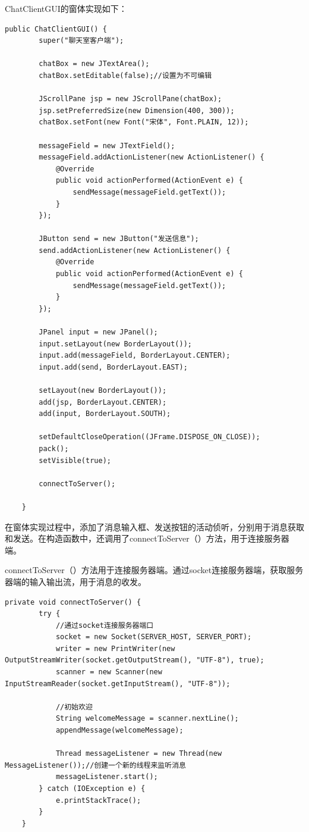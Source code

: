 \documentclass[UTF8,12pt]{article}
\begin{document}
ChatClientGUI的窗体实现如下：
\begin{lstlisting}[title=ChatClientGUI窗体实现,frame=shadowbox]
    public ChatClientGUI() {
        super("聊天室客户端");

        chatBox = new JTextArea();
        chatBox.setEditable(false);//设置为不可编辑

        JScrollPane jsp = new JScrollPane(chatBox);
        jsp.setPreferredSize(new Dimension(400, 300));
        chatBox.setFont(new Font("宋体", Font.PLAIN, 12));

        messageField = new JTextField();
        messageField.addActionListener(new ActionListener() {
            @Override
            public void actionPerformed(ActionEvent e) {
                sendMessage(messageField.getText());
            }
        });

        JButton send = new JButton("发送信息");
        send.addActionListener(new ActionListener() {
            @Override
            public void actionPerformed(ActionEvent e) {
                sendMessage(messageField.getText());
            }
        });

        JPanel input = new JPanel();
        input.setLayout(new BorderLayout());
        input.add(messageField, BorderLayout.CENTER);
        input.add(send, BorderLayout.EAST);

        setLayout(new BorderLayout());
        add(jsp, BorderLayout.CENTER);
        add(input, BorderLayout.SOUTH);

        setDefaultCloseOperation((JFrame.DISPOSE_ON_CLOSE));
        pack();
        setVisible(true);

        connectToServer();

    }
\end{lstlisting}
在窗体实现过程中，添加了消息输入框、发送按钮的活动侦听，分别用于消息获取和发送。在构造函数中，还调用了connectToServer（）方法，用于连接服务器端。

connectToServer（）方法用于连接服务器端。通过socket连接服务器端，获取服务器端的输入输出流，用于消息的收发。
\begin{lstlisting}[title=connectToServer方法实现,frame=shadowbox]
    private void connectToServer() {
        try {
            //通过socket连接服务器端口
            socket = new Socket(SERVER_HOST, SERVER_PORT);
            writer = new PrintWriter(new OutputStreamWriter(socket.getOutputStream(), "UTF-8"), true);
            scanner = new Scanner(new InputStreamReader(socket.getInputStream(), "UTF-8"));

            //初始欢迎
            String welcomeMessage = scanner.nextLine();
            appendMessage(welcomeMessage);

            Thread messageListener = new Thread(new MessageListener());//创建一个新的线程来监听消息
            messageListener.start();
        } catch (IOException e) {
            e.printStackTrace();
        }
    }
\end{lstlisting}
\end{document}

